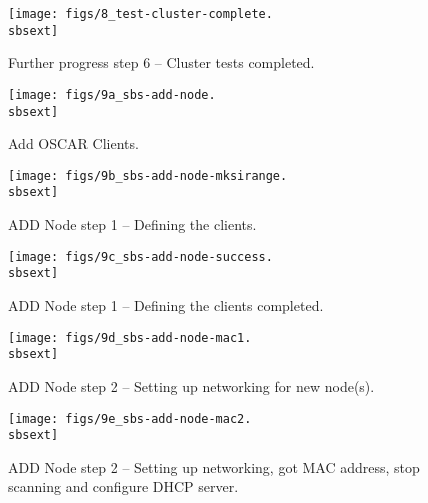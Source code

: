 \begin{figure}[htbp]
  \begin{center}
    \texttt{[image: figs/8\_test-cluster-complete.\\sbsext]}
    \caption{Further progress step 6 -- Cluster tests completed.}
    \label{fig:sbs-setup-test2}
  \end{center}
\end{figure}


\begin{figure}[htbp]
  \begin{center}
    \texttt{[image: figs/9a\_sbs-add-node.\\sbsext]}
    \caption{Add OSCAR Clients.}
    \label{fig:sbs-add-node1}
  \end{center}
\end{figure}


\begin{figure}[htbp]
  \begin{center}
    \texttt{[image: figs/9b\_sbs-add-node-mksirange.\\sbsext]}
    \caption{ADD Node step 1 -- Defining the clients.}
    \label{fig:sbs-add-node1-define-clients}
  \end{center}
\end{figure}

\begin{figure}[htbp]
  \begin{center}
    \texttt{[image: figs/9c\_sbs-add-node-success.\\sbsext]}
    \caption{ADD Node step 1 -- Defining the clients completed.}
    \label{fig:sbs-add-node1-define-clients2}
  \end{center}
\end{figure}


\begin{figure}[htbp]
  \begin{center}
    \texttt{[image: figs/9d\_sbs-add-node-mac1.\\sbsext]}
    \caption{ADD Node step 2 -- Setting up networking for new node(s).}
    \label{fig:sbs-add-node1-setup-network}
  \end{center}
\end{figure}

%
\begin{figure}[htbp]
  \begin{center}
    \texttt{[image: figs/9e\_sbs-add-node-mac2.\\sbsext]}
    \caption{ADD Node step 2 -- Setting up networking, got MAC address, stop scanning and configure DHCP server.}
    \label{fig:sbs-add-node1-setup-network2}
  \end{center}
\end{figure}

